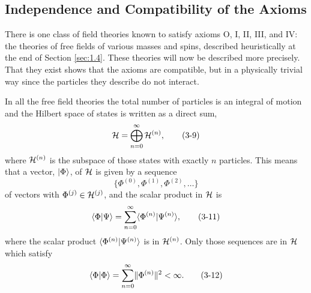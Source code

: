 \subsection{Independence and Compatibility of the Axioms}
\label{sec:ch3-2-independence}

There is one class of field theories known to satisfy axioms O, I, II,
III, and IV: the theories of free fields of various masses and spins,
described heuristically at the end of Section \ref{sec:1.4}.  These theories will
now be described more precisely.  That they exist shows that the axioms are
compatible, but in a physically trivial way since the particles they
describe do not interact.

In all the free field theories the total number of particles is an integral
of motion and the Hilbert space of states is written as a direct sum,
\begin{equation}
  \mathcal{H}=\bigoplus_{n=0}^{\infty}\mathcal{H}^{(n)},
  \tag{3-9}\label{eq:ch3-free-field-hilbert-sum}
\end{equation}
where $\mathcal{H}^{(n)}$ is the subspace of those states with exactly $n$
particles.  This means that a vector, $\lvert \Phi\rangle$, of $\mathcal{H}$ is given
by a sequence
\begin{equation}
  \{\Phi^{(0)},\Phi^{(1)},\Phi^{(2)},\ldots\}
  \tag{3-10}\label{eq:ch3-free-field-sequence}
\end{equation}
of vectors with $\Phi^{(j)}\in\mathcal{H}^{(j)}$, and the scalar product in
$\mathcal{H}$ is
\begin{equation}
  \langle \Phi\vert \Psi\rangle=\sum_{n=0}^{\infty}
  \langle \Phi^{(n)}\vert \Psi^{(n)}\rangle,
  \tag{3-11}\label{eq:ch3-free-field-inner-product}
\end{equation}
where the scalar product $\langle \Phi^{(n)}\vert \Psi^{(n)}\rangle$ is in
$\mathcal{H}^{(n)}$.  Only those sequences are in $\mathcal{H}$ which satisfy
\begin{equation}
  \langle \Phi\vert \Phi\rangle=\sum_{n=0}^{\infty}\lVert\Phi^{(n)}\rVert^2<\infty.
  \tag{3-12}\label{eq:ch3-free-field-norm}
\end{equation}

